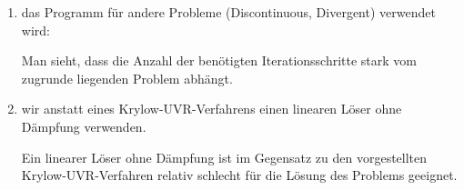 \documentclass[12pt,a4paper]{scrartcl}
\numberwithin{equation}{section}
\begin{document}
\begin{enumerate}
	\item das Programm für andere Probleme (Discontinuous, Divergent) verwendet wird:
	\begin{figure}[H]
		\centering
		\end{figure}
	Man sieht, dass die Anzahl der benötigten Iterationsschritte stark vom zugrunde liegenden Problem abhängt. 
	
    
	
	\item wir anstatt eines Krylow-UVR-Verfahrens einen linearen Löser ohne Dämpfung verwenden.
	
	\begin{figure}[H]
		\centering
		
	\end{figure}
	
	Ein linearer Löser ohne Dämpfung ist im Gegensatz zu den vorgestellten Krylow-UVR-Verfahren relativ schlecht für die Lösung des Problems geeignet. 
\end{enumerate}
\end{document}
